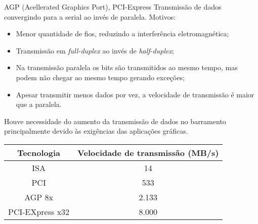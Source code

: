 \begin{frame}{\thetitle}{AGP (Acellerated Graphics Port), PCI-Express}
\footnotesize
  Transmissão de dados convergindo para a serial ao invés de
  paralela. Motivos:
  \begin{itemize}
  \item Menor quantidade de fios, reduzindo a interferência eletromagnética;
  \item Transmissão em {\em full-duplex} ao invés de {\em half-duplex};
  \item Na transmissão paralela os bits são transmitidos ao mesmo
    tempo, mas podem não chegar ao mesmo tempo gerando exceções;
  \item Apesar transmitir menos dados por vez, a velocidade de
    transmissão é maior que a paralela.
  \end{itemize}
  
  Houve necessidade do aumento da transmissão de dados no barramento
  principalmente devido às exigências das aplicações gráficas.\\
\begin{center}
  \begin{tabular}{|c|c|}\hline
    Tecnologia & Velocidade de transmissão (MB/s)  \\\hline
    ISA & 14 \\
    PCI & 533 \\
    AGP 8x & 2.133 \\
    PCI-EXpress x32 & 8.000 \\\hline
  \end{tabular}
\end{center}
\end{frame}

